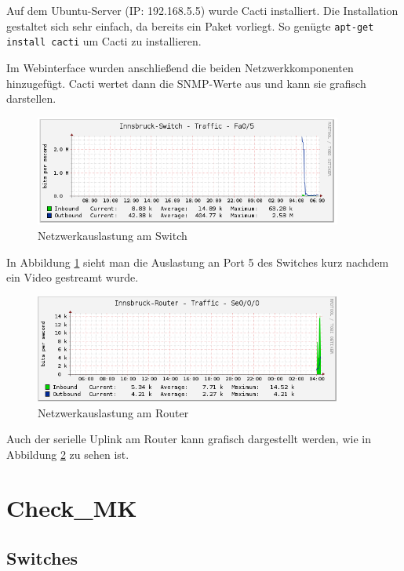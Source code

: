 Auf dem Ubuntu-Server (IP: 192.168.5.5) wurde Cacti installiert. Die Installation gestaltet sich sehr einfach, da bereits ein Paket vorliegt. 
So genügte \texttt{apt-get install cacti} um Cacti zu installieren.

Im Webinterface wurden anschließend die beiden Netzwerkkomponenten hinzugefügt. Cacti wertet dann die \ac{SNMP}-Werte aus und kann sie grafisch darstellen.

\begin{figure}[H]
	\centering
	\includegraphics[width=0.9\textwidth]{img/andi_youtube.PNG}
	\caption{Netzwerkauslastung am Switch}
	\label{img:yt}
\end{figure}

In Abbildung \ref{img:yt} sieht man die Auslastung an Port 5 des Switches kurz nachdem ein Video gestreamt wurde. 

\begin{figure}[H]
	\centering
	\includegraphics[width=0.9\textwidth]{img/cacti_graph_s00.PNG}
	\caption{Netzwerkauslastung am Router}
	\label{img:uplink}
\end{figure}

Auch der serielle Uplink am Router kann grafisch dargestellt werden, wie in Abbildung \ref{img:uplink} zu sehen ist.

\chapter{Check\_MK}
\label{checkmk}

\section{Switches}

